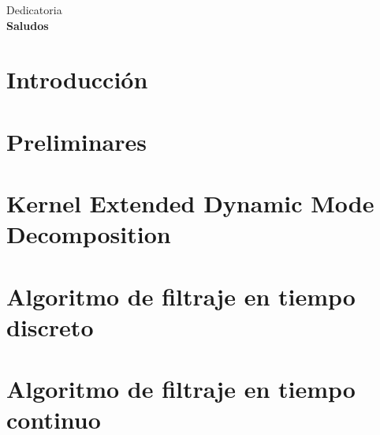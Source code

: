 \documentclass[
	spanish, %
	letterpaper, oneside
]{book}
\begin{document}
\templatePortrait

\templatePagecfg

\begin{abstractd}
	\lipsum[1]
\end{abstractd}

\begin{dedicatory}
	Dedicatoria \\
	\textbf{Saludos}
\end{dedicatory}

\begin{acknowledgments}
	\lipsum[1]
\end{acknowledgments}

\templateIndex

\templateFinalcfg


\chapter{Introducción}


\chapter{Preliminares}


\chapter{Kernel Extended Dynamic Mode Decomposition}


\chapter{Algoritmo de filtraje en tiempo discreto}


\chapter{Algoritmo de filtraje en tiempo continuo}

\end{document}
